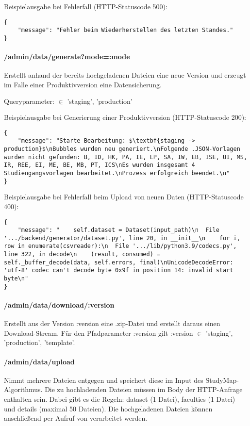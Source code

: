 \noindent
Beispielausgabe bei Fehlerfall (HTTP-Statuscode 500):
\begin{lstlisting}[style=Python]
{
    "message": "Fehler beim Wiederherstellen des letzten Standes."
}
\end{lstlisting}

\paragraph*{/admin/data/generate?mode=:mode}
\vspace{-1.0em}
Erstellt anhand der bereits hochgeladenen Dateien eine neue Version und erzeugt im Falle einer Produktivversion eine Datensicherung.

\noindent
Queryparameter:  $\in$ {'staging', 'production'}

\noindent
Beispielausgabe bei Generierung einer Produktivversion (HTTP-Statuscode 200):
\begin{lstlisting}[style=Python, mathescape=true]
{
    "message": "Starte Bearbeitung: $\textbf{staging -> production}$\nBubbles wurden neu generiert.\nFolgende .JSON-Vorlagen wurden nicht gefunden: B, ID, HK, PA, IE, LP, SA, IW, EB, ISE, UI, MS, IR, REE, EI, ME, BE, MB, PT, ICS\nEs wurden insgesamt 4 Studiengangsvorlagen bearbeitet.\nProzess erfolgreich beendet.\n"
}
\end{lstlisting}

\noindent
Beispielausgabe bei Fehlerfall beim Upload von neuen Daten (HTTP-Statuscode 400):
\begin{lstlisting}[style=Python]
{
    "message": "    self.dataset = Dataset(input_path)\n  File '.../backend/generator/dataset.py', line 20, in __init__\n    for i, row in enumerate(csvreader):\n  File '.../lib/python3.9/codecs.py', line 322, in decode\n    (result, consumed) = self._buffer_decode(data, self.errors, final)\nUnicodeDecodeError: 'utf-8' codec can't decode byte 0x9f in position 14: invalid start byte\n"
}
\end{lstlisting}

\paragraph*{/admin/data/download/:version}
\vspace{-1.0em}
Erstellt aus der Version :version eine .zip-Datei und erstellt daraus einen Download-Stream. Für den Pfadparameter :version gilt :version $\in$ {'staging', 'production', 'template'}.

\paragraph*{/admin/data/upload}
\vspace{-1.0em}
Nimmt mehrere Dateien entgegen und speichert diese im Input des StudyMap-Algorithmus. Die zu hochladenden Dateien müssen im Body der HTTP-Anfrage enthalten sein. Dabei gibt es die Regeln: dataset (1 Datei), faculties (1 Datei) und details (maximal 50 Dateien). Die hochgeladenen Dateien können anschließend per Aufruf von  verarbeitet werden.

